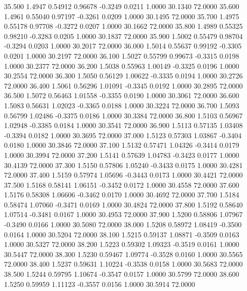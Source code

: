   35.500   1.4947   0.54912   0.96678  -0.3249   0.0211   1.0000  30.1340  72.0000
  35.600   1.4961   0.55040   0.97197  -0.3261   0.0209   1.0000  30.1495  72.0000
  35.700   1.4975   0.55178   0.97708  -0.3272   0.0207   1.0000  30.1662  72.0000
  35.800   1.4989   0.55325   0.98210  -0.3283   0.0205   1.0000  30.1837  72.0000
  35.900   1.5002   0.55479   0.98704  -0.3294   0.0203   1.0000  30.2017  72.0000
  36.000   1.5014   0.55637   0.99192  -0.3305   0.0201   1.0000  30.2197  72.0000
  36.100   1.5027   0.55799   0.99673  -0.3315   0.0198   1.0000  30.2377  72.0000
  36.200   1.5038   0.55963   1.00149  -0.3325   0.0196   1.0000  30.2554  72.0000
  36.300   1.5050   0.56129   1.00622  -0.3335   0.0194   1.0000  30.2726  72.0000
  36.400   1.5061   0.56296   1.01091  -0.3345   0.0192   1.0000  30.2895  72.0000
  36.500   1.5072   0.56463   1.01558  -0.3355   0.0190   1.0000  30.3061  72.0000
  36.600   1.5083   0.56631   1.02023  -0.3365   0.0188   1.0000  30.3224  72.0000
  36.700   1.5093   0.56799   1.02486  -0.3375   0.0186   1.0000  30.3384  72.0000
  36.800   1.5103   0.56967   1.02948  -0.3385   0.0184   1.0000  30.3541  72.0000
  36.900   1.5113   0.57135   1.03408  -0.3394   0.0182   1.0000  30.3695  72.0000
  37.000   1.5123   0.57303   1.03867  -0.3404   0.0180   1.0000  30.3846  72.0000
  37.100   1.5132   0.57471   1.04326  -0.3414   0.0179   1.0000  30.3994  72.0000
  37.200   1.5141   0.57639   1.04783  -0.3423   0.0177   1.0000  30.4139  72.0000
  37.300   1.5150   0.57806   1.05240  -0.3433   0.0175   1.0000  30.4281  72.0000
  37.400   1.5159   0.57974   1.05696  -0.3443   0.0173   1.0000  30.4421  72.0000
  37.500   1.5168   0.58141   1.06151  -0.3452   0.0172   1.0000  30.4558  72.0000
  37.600   1.5176   0.58308   1.06606  -0.3462   0.0170   1.0000  30.4692  72.0000
  37.700   1.5184   0.58474   1.07060  -0.3471   0.0169   1.0000  30.4824  72.0000
  37.800   1.5192   0.58640   1.07514  -0.3481   0.0167   1.0000  30.4953  72.0000
  37.900   1.5200   0.58806   1.07967  -0.3490   0.0166   1.0000  30.5080  72.0000
  38.000   1.5208   0.58972   1.08419  -0.3500   0.0164   1.0000  30.5204  72.0000
  38.100   1.5215   0.59137   1.08871  -0.3509   0.0163   1.0000  30.5327  72.0000
  38.200   1.5223   0.59302   1.09323  -0.3519   0.0161   1.0000  30.5447  72.0000
  38.300   1.5230   0.59467   1.09774  -0.3528   0.0160   1.0000  30.5565  72.0000
  38.400   1.5237   0.59631   1.10224  -0.3538   0.0158   1.0000  30.5683  72.0000
  38.500   1.5244   0.59795   1.10674  -0.3547   0.0157   1.0000  30.5799  72.0000
  38.600   1.5250   0.59959   1.11123  -0.3557   0.0156   1.0000  30.5914  72.0000
